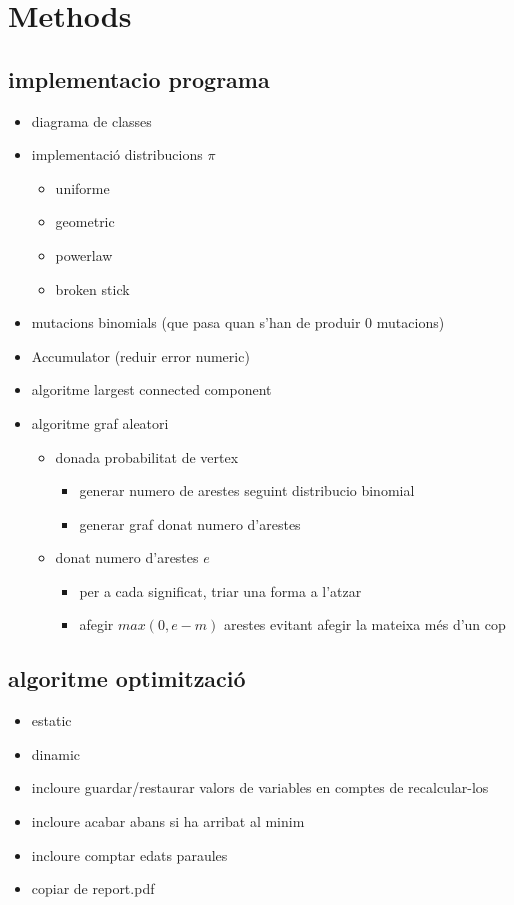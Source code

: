 \chapter{Methods}
\section{implementacio programa}
\begin{itemize}
\item diagrama de classes
\item implementació distribucions $\pi$
  \begin{itemize}
  \item uniforme
  \item geometric
  \item powerlaw
  \item broken stick
  \end{itemize}
\item mutacions binomials (que pasa quan s'han de produir 0 mutacions)
\item Accumulator (reduir error numeric)
\item algoritme largest connected component
\item algoritme graf aleatori
  \begin{itemize}
  \item donada probabilitat de vertex
    \begin{itemize}
    \item generar numero de arestes seguint distribucio binomial
    \item generar graf donat numero d'arestes
    \end{itemize}
  \item donat numero d'arestes $e$
    \begin{itemize}
    \item per a cada significat, triar una forma a l'atzar
    \item afegir $max(0, e-m)$ arestes evitant afegir la mateixa més d'un cop
    \end{itemize}
  \end{itemize}
\end{itemize}
\section{algoritme optimització}
\begin{itemize}
\item estatic
\item dinamic
\item incloure guardar/restaurar valors de variables en comptes de
  recalcular-los
\item incloure acabar abans si ha arribat al minim
\item incloure comptar edats paraules
\item copiar de report.pdf
\end{itemize}
